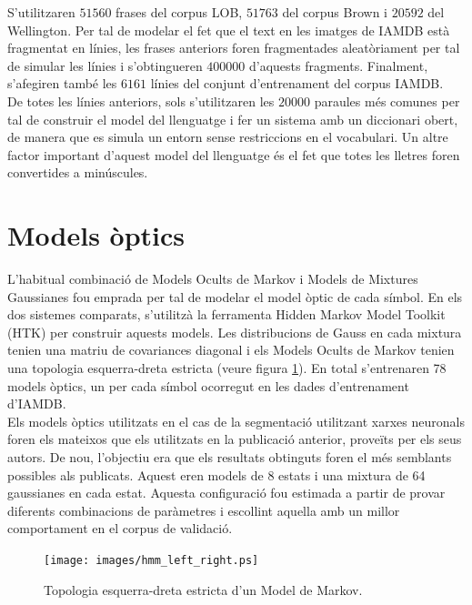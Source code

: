 S'utilitzaren $51560$ frases del corpus LOB, $51763$ del corpus Brown i $20592$ del Wellington. Per tal de modelar el fet que el text en les imatges de IAMDB està fragmentat en línies, les frases anteriors foren fragmentades aleatòriament per tal de simular les línies i s'obtingueren $400000$ d'aquests fragments. Finalment, s'afegiren també les $6161$ línies del conjunt d'entrenament del corpus IAMDB.\\

De totes les línies anteriors, sols s'utilitzaren les $20000$ paraules més comunes per tal de construir el model del llenguatge i fer un sistema amb un diccionari obert, de manera que es simula un entorn sense restriccions en el vocabulari. Un altre factor important d'aquest model del llenguatge és el fet que totes les lletres foren convertides a minúscules.

\section{Models òptics}
L'habitual combinació de Models Ocults de Markov i Models de Mixtures Gaussianes fou emprada per tal de modelar el model òptic de cada símbol. En els dos sistemes comparats, s'utilitzà la ferramenta Hidden Markov Model Toolkit (HTK) \cite{young1993htk} per construir aquests models. Les distribucions de Gauss en cada mixtura tenien una matriu de covariances diagonal i els Models Ocults de Markov tenien una topologia esquerra-dreta estricta (veure figura \ref{fig:hmm_left_right}). En total s'entrenaren 78 models òptics, un per cada símbol ocorregut en les dades d'entrenament d'IAMDB.\\

Els models òptics utilitzats en el cas de la segmentació utilitzant xarxes neuronals foren els mateixos que els utilitzats en la publicació anterior, proveïts per els seus autors. De nou, l'objectiu era que els resultats obtinguts foren el més semblants possibles als publicats. Aquest eren models de 8 estats i una mixtura de 64 gaussianes en cada estat. Aquesta configuració fou estimada a partir de provar diferents combinacions de paràmetres i escollint aquella amb un millor comportament en el corpus de validació.\\

\begin{figure}
\centering
\texttt{[image: images/hmm\_left\_right.ps]}
\caption{Topologia esquerra-dreta estricta d'un Model de Markov.}\label{fig:hmm_left_right}
\end{figure}

